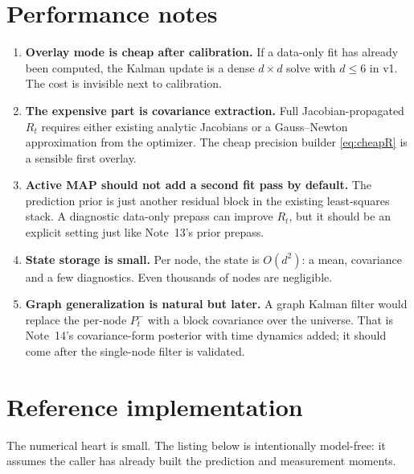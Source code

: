 \documentclass[11pt]{article}
\begin{document}
\section{Performance notes}
\label{app:perf}

\begin{enumerate}[leftmargin=1.6em]
\item \textbf{Overlay mode is cheap after calibration.} If a data-only fit has
already been computed, the Kalman update is a dense $d\times d$ solve with
$d\le6$ in v1. The cost is invisible next to calibration.
\item \textbf{The expensive part is covariance extraction.} Full
Jacobian-propagated $R_t$ requires either existing analytic Jacobians or a
Gauss--Newton approximation from the optimizer. The cheap precision builder
\eqref{eq:cheapR} is a sensible first overlay.
\item \textbf{Active MAP should not add a second fit pass by default.} The
prediction prior is just another residual block in the existing least-squares
stack. A diagnostic data-only prepass can improve $R_t$, but it should be an
explicit setting just like Note~13's prior prepass.
\item \textbf{State storage is small.} Per node, the state is $O(d^2)$: a mean,
covariance and a few diagnostics. Even thousands of nodes are negligible.
\item \textbf{Graph generalization is natural but later.} A graph Kalman filter
would replace the per-node $P_t^-$ with a block covariance over the universe.
That is Note~14's covariance-form posterior with time dynamics added; it should
come after the single-node filter is validated.
\end{enumerate}

\section{Reference implementation}
\label{app:ref}

The numerical heart is small. The listing below is intentionally model-free: it
assumes the caller has already built the prediction and measurement moments.
\end{document}
